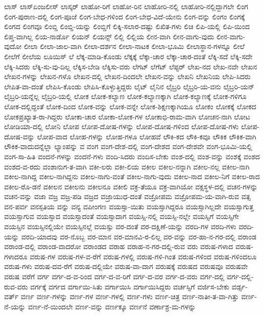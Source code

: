 {ಲಾಸ್
ಲಾಸ್ಏಂಜಲೀಸ್
ಲಾಸ್ಕರ್
ಲಾಹೋ-ರಿಗೆ
ಲಾಹೋ-ರಿನ
ಲಾಹೋರಿ-ನಲ್ಲಿ
ಲಾಹೋರಿ-ನಲ್ಲಿದ್ದಾಗಲೇ
ಲಿಂಗ
ಲಿಂಗ-ಪುರಾಣ-ದಲ್ಲಿ
ಲಿಂಗ-ಪೂಜೆ
ಲಿಂಗ-ಬೇಧ-ಗಳಿಂದ
ಲಿಂಗ-ಬೇಧ-ವಿದೆ-ಯೇನು
ಲಿಂಗ-ವನ್ನು
ಲಿಂಗಂ
ಲಿಂಗಕ್ಕೆ
ಲಿಂಗದ
ಲಿಂಗವೂ
ಲಿಂಬ್ಡಿ
ಲಿಂಬ್ಡಿ-ಯನ್ನು
ಲಿಂಬ್ಡಿಗೆ
ಲಿಕ್ಕಿ-ಸಲಾರ-ದಷ್ಟು
ಲಿಖಿತ-ಗಳು
ಲಿಚಿ
ಲಿಪಿ-ಯಲ್ಲಿ
ಲಿಪಿ-ಯಿಂದ
ಲಿಪ್ತ-ವಾಗಿಲ್ಲ
ಲಿಯ-ನಾರ್ಡೊ
ಲಿಯನ್
ಲಿಯನ್ಸ್
ಲಿಲ್ಲಿ
ಲಿಲ್ಲಿಯ
ಲೀನ-ವಾಗಿ
ಲೀನ-ವಾಗು-ವುದು
ಲೀನ-ವಾಗು-ವುದೋ
ಲೀಲಾ
ಲೀಲಾ-ಜಾಲ-ವಾಗಿ
ಲೀಲಾ-ದರ್ಶನ
ಲೀಲಾ-ನಾಟಕ
ಲೀಲಾ-ಭೂಮಿ
ಲೀಲಾಸ್ಥಾನ-ಗಳನ್ನೂ
ಲೀಲೆ
ಲೀಲೆಗೆ
ಲೀಲೆಯ
ಲೂಯಿಸ್
ಲೆ
ಲೆಕ್ಕ-ಮಾಡಿ-ಕೊಂಡು
ಲೆಕ್ಕಕ್ಕೆ
ಲೆಕ್ಕಾ-ಚಾರ
ಲೆಕ್ಕಾ-ಚಾರ-ದಂತೆ
ಲೆಕ್ಕಿ-ಸದೆ
ಲೆಕ್ಕಿ-ಸದೇ
ಲೆಕ್ಕಿ-ಸಿದರು
ಲೆಕ್ಕಿ-ಸು-ವು-ದಿಲ್ಲ
ಲೆಕ್ಕಿಸ-ಬೇಡಿ
ಲೆಕ್ಕಿಸು-ವರು
ಲೆಗಟ್
ಲೆಗೆಟ್
ಲೆಪ್ಟರ್
ಲೇಖ-ನದ
ಲೇಖ-ನವೇ
ಲೇಖನ
ಲೇಖನ-ಗಳನ್ನು
ಲೇಖನ-ಗಳೊ
ಲೇಖನ-ದಲ್ಲಿ
ಲೇಖನ-ದಿಂದಲೇ
ಲೇಖನ-ವನ್ನು
ಲೇಖನಿ
ಲೇಖನಿಯ
ಲೇಪಿ-ಸಿದರು
ಲೇಪಿತ-ವಾ-ದಂತೆ
ಲೇಪಿಸಿ-ಕೊಂಡು
ಲೇಪಿಸಿ-ಕೊಳ್ಳುತ್ತಿದ್ದರು
ಲೈಟ್
ಲೈನಿನ
ಲೈಬ್ರರಿ
ಲೈಬ್ರರಿ-ಯ-ವನು
ಲೈಬ್ರರಿ-ಯನ್
ಲೈಬ್ರರಿ-ಯನ್ನೆಲ್ಲ
ಲೈಬ್ರರಿ-ಯಲ್ಲಿ
ಲೋಕ
ಲೋಕ-ಕಲ್ಯಾಣ
ಲೋಕ-ಕಲ್ಯಾಣಕ್ಕಾಗಿ
ಲೋಕ-ಕಲ್ಯಾಣಕ್ಕೆ
ಲೋಕ-ಗಳಿಗೂ
ಲೋಕ-ದಲ್ಲಿದ್ದಂತೆ
ಲೋಕ-ದಿಂದ
ಲೋಕ-ವನ್ನು
ಲೋಕ-ವನ್ನೇ
ಲೋಕ-ಶಿಕ್ಷಣಕ್ಕಾಗಿಯೂ
ಲೋಕಂ
ಲೋಕಕ್ಕೆ
ಲೋಕದ
ಲೋಕಪ್ರಖ್ಯಾತ-ರಾ-ಗಿದ್ದರು
ಲೋಕಾ-ಚಾರ
ಲೋಕಾ-ಲೋಕ-ಗಳ
ಲೋಕಾಭಿ-ರಾಮ-ವಾಗಿ
ಲೋಚನ-ನಾಗಿ
ಲೋಟ
ಲೋಡಿಯಾ-ದಲ್ಲಿ
ಲೋನಿ
ಲೋಪ
ಲೋಪ-ದೋಷ-ಗಳನ್ನು
ಲೋಪ-ದೋಷ-ಗಳಿಂದ
ಲೋಪ-ದೋಷ-ಗಳು
ಲೋಪ-ದೋಷ-ವನ್ನು
ಲೋಪ-ವಾದ
ಲೋಹ-ಗಳನ್ನು
ಲೋಹ-ಗಳೂ
ಲೋಹವೆ
ಲೌಕಿ-ಕದ
ಲೌಕಿ-ಕವೂ
ಲೌಕಿಕ
ಲೌಕಿಕ-ವಾಗಿ
ಲೌಕಿಕ-ವಾದುದನ್ನೆಲ್ಲಾ
ಲ್ಯಾಂಪನ್ನು
ವ
ವಂಗ
ವಂಗ-ದೇಶ-ದಲ್ಲಿ
ವಂಗ-ದೇಶದ
ವಂಗ-ದೇಶವೇ
ವಂಗ-ಭೂಮಿ-ಯಲ್ಲಿ
ವಂಗ-ಸಾ-ಹಿತಿ
ವಂದನೆ-ಗಳನ್ನು
ವಂದನೆ-ಗಳು
ವಂದಿ-ಸಿದರು
ವಂದಿಸ-ಬೇಕು
ವಂಶ-ದಲ್ಲಿ
ವಂಶ-ವನ್ನು
ವಂಶಕ್ಕೆ
ವಂಶದ
ವಂಶದ-ವ-ರದು
ವಂಶಾನುಗ-ತ-ವಾಗಿ
ವಕೀ-ಲರು
ವಕೀ-ಲಿಯ
ವಕೀಲ
ವಕೀಲ-ನನ್ನಾಗಿ
ವಕೀಲ-ನಲ್ಲ
ವಕೀಲ-ನಾಗಿ
ವಕೀಲ-ನಾಗಿದ್ದ
ವಕೀಲ-ನಾಗಿದ್ದನು
ವಕೀಲ-ನಾಗು-ವಂತೆ
ವಕೀಲ-ನಾಗು-ವುದು
ವಕೀಲ-ನಾದ
ವಕೀಲ-ನಿಗೆ
ವಕೀಲ-ರಾದ
ವಕೀಲ-ರೊ-ಡನೆ
ವಕೀಲನ
ವಕೀಲನು
ವಕೀಲನೂ
ವಕೀಲಿ
ವಕ್ರ-ತೆಯೂ
ವಕ್ರ-ವಾಗಿಯೋ
ವಕ್ಷಸ್ಥಳ-ದಲ್ಲಿ
ವಚನ-ಗಳನ್ನು
ವಚನ-ವನ್ನು
ವಜಾ
ವಜ್ರ
ವಜ್ರ-ಪಡಿ
ವಜ್ರದ
ವಜ್ರಾಯುಧ-ದಂತೆ
ವಜ್ರೋಪಮ
ವಜ್ರೋಪಮ-ಯ-ವಾಗಿ-ರುವ
ವತ್ಸ
ವನ-ಪರ್ವ
ವನಸ್ಪತಿಯ
ವನ್ನು
ವನ್ಯ
ವಪೀಂಗಣ
ವಯಸ್ಸಾ-ಯಿತು
ವಯಸ್ಸಾಗಿದ್ದರೂ
ವಯಸ್ಸಾಗಿಲ್ಲದೇ
ವಯಸ್ಸಾಗುತ್ತ
ವಯಸ್ಸಾಗುವ
ವಯಸ್ಸಾದ
ವಯಸ್ಸಾದಂತೆ
ವಯಸ್ಸಾದಾಗ
ವಯಸ್ಸಿ-ನಲ್ಲಿ
ವಯಸ್ಸಿ-ನಲ್ಲೇ
ವಯಸ್ಸಿಗೆ
ವಯಸ್ಸಿಗೇ
ವಯಸ್ಸಿನ
ವಯಸ್ಸಿನಲ್ಲಿಯೇ
ವಯಸ್ಸಿನಲ್ಲೆ
ವಯಸ್ಸು
ವರ-ದಂತೆ
ವರ-ದಕ್ಷಿಣೆ-ಯನ್ನು
ವರದಿ-ಗಳ
ವರದಿ-ಗಳು
ವರದಿ-ಯನ್ನು
ವರದಿ-ಯಾದವು
ವರ-ನೊಬ್ಬ
ವರ-ಮಾನ
ವರ-ಮಾನವಿ-ರ-ಲಿಲ್ಲ
ವರ-ವನ್ನು
ವರ-ಹಾ-ನ-ಗರ-ದಲ್ಲಿ
ವರಾಂಡ
ವರಾಂಡ-ದಲ್ಲಿ
ವರಾಂಡ-ವಾದರೋ
ವರಾಂಡದ
ವರಾಹ
ವರಾಹ-ನ-ಗರ-ದಲ್ಲಿ-ರುವ
ವರು
ವರುಷ-ಗಳಾದ
ವರುಷ-ಗಳಾದರೂ
ವರುಷ-ಗಳ
ವರುಷ-ಗಳ-ವ-ರೆಗೆ
ವರುಷ-ಗಳಲ್ಲಿ
ವರುಷ-ಗಳಿ-ಗಿಂತ
ವರುಷ-ಗಳಿಂದ
ವರುಷ-ಗಳಿಂದಲೂ
ವರುಷ-ಗಳು
ವರುಷ-ದವ-ರೆಗೆ
ವರುಷ-ದಲ್ಲಿಯೇ
ವರುಷ-ವಾ-ದಾಗ
ವರುಷಕ್ಕೆ
ವರುಷದ
ವರುಷವೂ
ವರುಷವೇ
ವರುಷ
ವರೆಗೆ
ವರ್ಗ
ವರ್ಗ-ದ-ವ-ರಿಂದ
ವರ್ಗ-ದ-ವ-ರಿಗೆ
ವರ್ಗ-ದ-ವರ
ವರ್ಗ-ದ-ವರು
ವರ್ಗ-ದಲ್ಲಿ
ವರ್ಗ-ದಲ್ಲಿ-ರುವ-ವರು
ವರ್ಗಕ್ಕೆ
ವರ್ಗದ
ವರ್ಗಾಯಿ-ಸಿತು
ವರ್ಗಾಯಿಸಿ
ವರ್ಗಾಯಿಸಿದ್ದರು
ವರ್ಚಸ್ಸಿಗೆ
ವರ್ಜಿಸ-ಬೇಕು
ವರ್ಡ್ಸ-ವರ್ತ್
ವರ್ಣ
ವರ್ಣ-ಗಳನ್ನು
ವರ್ಣ-ಗಳ
ವರ್ಣ-ಗಳಲ್ಲಿ
ವರ್ಣ-ಗಳು
ವರ್ಣ-ಚಿತ್ರ
ವರ್ಣ-ನಾತೀ-ತ-ವಾ-ಗಿತ್ತು
ವರ್ಣ-ನೆ-ಯನ್ನು
ವರ್ಣ-ನೆ-ಯಿಂದಲೇ
ವರ್ಣ-ವನ್ನು
ವರ್ಣಕ್ಕೂ
ವರ್ಣನೆ
ವರ್ಣಾಶ್ರ-ಮ-ಗಳನ್ನು
}

